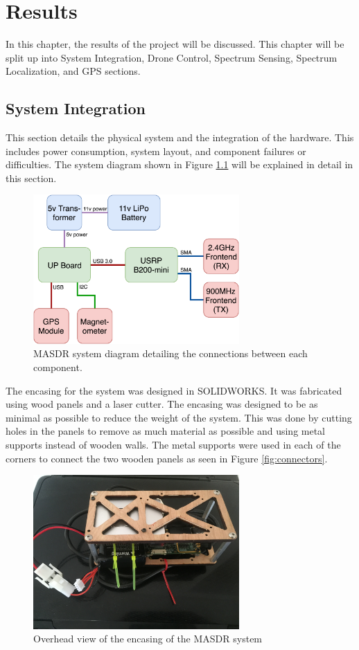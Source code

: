 \chapter{Results}
In this chapter, the results of the project will be discussed. This chapter will be split up into System Integration, Drone Control, Spectrum Sensing, Spectrum Localization, and GPS sections.

\section{System Integration}
This section details the physical system and the integration of the hardware. This includes power consumption, system layout, and component failures or difficulties. The system diagram shown in Figure \ref{fig:masdr_system_diagram} will be explained in detail in this section.
\begin{figure}[ht!]
	\centering
	\includegraphics[width=0.70\textwidth]{img/masdr_system_diagram.png}
	\caption{MASDR system diagram detailing the connections between each component.}
	\label{fig:masdr_system_diagram}
\end{figure}\par
The encasing for the system was designed in SOLIDWORKS. It was fabricated using wood panels and a laser cutter. The encasing was designed to be as minimal as possible to reduce the weight of the system. This was done by cutting holes in the panels to remove as much material as possible and using metal supports instead of wooden walls. The metal supports were used in each of the corners to connect the two wooden panels as seen in Figure \ref{fig:connectors}.
\begin{figure}[ht!]
	\centering
	\includegraphics[width=0.70\textwidth]{img/Overhead_of_box.JPG}
	\caption{Overhead view of the encasing of the MASDR system}
	\label{fig:overhead_of_box}
\end{figure}\par

